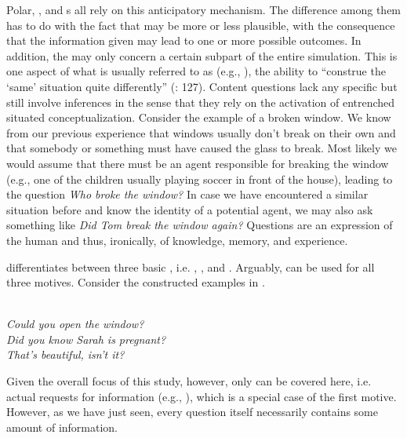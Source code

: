 \noindent Polar, , and s all rely on this anticipatory mechanism. The difference among them has to do with the fact that  may be more or less plausible, with the consequence that the information given may lead to one or more possible outcomes. In addition, the  may only concern a certain subpart of the entire simulation. This is one aspect of what is usually referred to as \textit{} (e.g., \citealt{Langacker2008}), the ability to “construe the ‘same’ situation quite differently” (\citealt{Ross2014}: 127). Content questions lack any specific  but still involve inferences in the sense that they rely on the activation of entrenched situated conceptualization. Consider the example of a broken window. We know from our previous experience that windows usually don’t break on their own and that somebody or something must have caused the glass to break. Most likely we would assume that there must be an agent responsible for breaking the window (e.g., one of the children usually playing soccer in front of the house), leading to the question \textit{Who broke the window?} In case we have encountered a similar situation before and know the identity of a potential agent, we may also ask something like \textit{Did Tom break the window again?} Questions are an expression of the human  and thus, ironically, of knowledge, memory, and experience.

\cite[84–87]{Tomasello2008} differentiates between three basic , i.e. \textit{}, \textit{}, and \textit{}. Arguably,  can be used for all three motives. Consider the constructed examples in .

\ea%
    \label{ex:4:46}
    \\
    \ea
      \textit{Could you open the window?}\\

    \ex
      \textit{Did you know Sarah is pregnant?}\\

    \ex
      \textit{That’s beautiful, isn’t it?}\\

    \z
    \z 

\noindent Given the overall focus of this study, however, only  can be covered here, i.e. actual requests for information (e.g., \citealt{Levinson2012b}), which is a special case of the first motive. However, as we have just seen, every question itself necessarily contains some amount of information.

